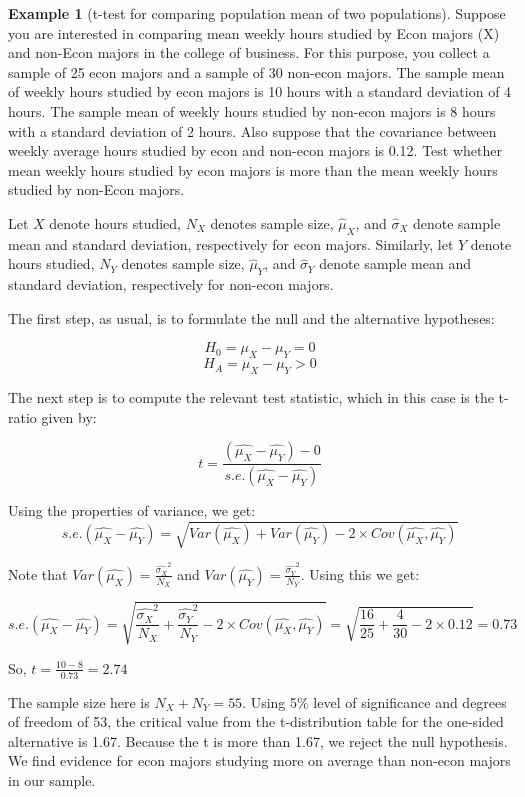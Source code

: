 \documentclass[
]{book}
\theoremstyle{definition}
\theoremstyle{definition}
\newtheorem{example}{Example}[chapter]
\theoremstyle{definition}
\theoremstyle{definition}
\theoremstyle{remark}
\begin{document}
\begin{example}[t-test for comparing population mean of two populations]
\protect\hypertarget{exm:unnamed-chunk-50}{}\label{exm:unnamed-chunk-50}Suppose you are interested in comparing mean weekly hours studied by Econ majors (X) and non-Econ majors in the college of business. For this purpose, you collect a sample of 25 econ majors and a sample of 30 non-econ majors. The sample mean of weekly hours studied by econ majors is 10 hours with a standard deviation of 4 hours. The sample mean of weekly hours studied by non-econ majors is 8 hours with a standard deviation of 2 hours. Also suppose that the covariance between weekly average hours studied by econ and non-econ majors is 0.12. Test whether mean weekly hours studied by econ majors is more than the mean weekly hours studied by non-Econ majors.

Let \(X\) denote hours studied, \(N_X\) denotes sample size, \(\hat{\mu}_X\), and \(\hat{\sigma}_X\) denote sample mean and standard deviation, respectively for econ majors. Similarly, let \(Y\) denote hours studied, \(N_Y\) denotes sample size, \(\hat{\mu}_Y\), and \(\hat{\sigma}_Y\) denote sample mean and standard deviation, respectively for non-econ majors.

The first step, as usual, is to formulate the null and the alternative hypotheses:

\[H_0= \mu_X - \mu_Y = 0\]
\[H_A= \mu_X - \mu_Y > 0\]

The next step is to compute the relevant test statistic, which in this case is the t-ratio given by:

\[t= \frac{(\hat{\mu_X}-\hat{\mu_Y})-0}{s.e.(\hat{\mu_X}-\hat{\mu_Y})}\]

Using the properties of variance, we get:
\[s.e.(\hat{\mu_X}-\hat{\mu_Y})=\sqrt{Var(\hat{\mu_X})+Var(\hat{\mu_Y})-2 \times Cov(\hat{\mu_X},\hat{\mu_Y})}\]

Note that \(\displaystyle Var(\hat{\mu_X})= \frac{\widehat{\sigma_X}^2}{N_X}\) and \(\displaystyle Var(\hat{\mu_Y})= \frac{\widehat{\sigma_Y}^2}{N_Y}\). Using this we get:

\[s.e.(\hat{\mu_X}-\hat{\mu_Y})=\sqrt{\frac{\widehat{\sigma_X}^2}{N_X}+\frac{\widehat{\sigma_Y}^2}{N_Y}-2 \times Cov(\hat{\mu_X},\hat{\mu_Y})}=\sqrt{\frac{16}{25}+\frac{4}{30}-2 \times 0.12}=0.73 \]

So, \(t=\displaystyle \frac{10-8}{0.73}=2.74\)

The sample size here is \(N_X+N_Y=55\). Using 5\% level of significance and degrees of freedom of 53, the critical value from the t-distribution table for the one-sided alternative is 1.67. Because the \textbar t\textbar{} is more than 1.67, we reject the null hypothesis. We find evidence for econ majors studying more on average than non-econ majors in our sample.
\end{example}
\end{document}
